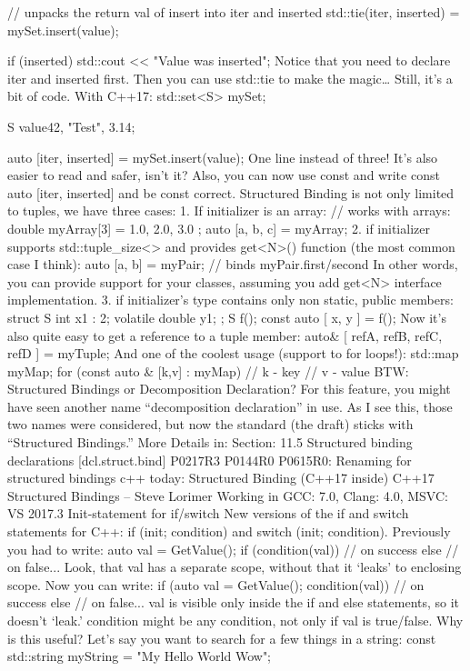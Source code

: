 // unpacks the return val of insert into iter and inserted
std::tie(iter, inserted) = mySet.insert(value);

if (inserted)
    std::cout << "Value was inserted\n";
Notice that you need to declare iter and inserted first. Then you can use std::tie to make the magic… Still, it’s a bit of code.
With C++17:
std::set<S> mySet;

S value{42, "Test", 3.14};

auto [iter, inserted] = mySet.insert(value);
One line instead of three! It’s also easier to read and safer, isn’t it?
Also, you can now use const and write const auto [iter, inserted] and be const correct.
Structured Binding is not only limited to tuples, we have three cases:
1. If initializer is an array:
// works with arrays:
double myArray[3] = { 1.0, 2.0, 3.0 };  
auto [a, b, c] = myArray;
2. if initializer supports std::tuple_size<> and provides get<N>() function (the most common case I think):
auto [a, b] = myPair; // binds myPair.first/second
In other words, you can provide support for your classes, assuming you add get<N> interface implementation.
3. if initializer’s type contains only non static, public members:
struct S { int x1 : 2; volatile double y1; };
S f();
const auto [ x, y ] = f();
Now it’s also quite easy to get a reference to a tuple member:
auto& [ refA, refB, refC, refD ] = myTuple;
And one of the coolest usage (support to for loops!):
std::map myMap;    
for (const auto & [k,v] : myMap) 
{  
    // k - key
    // v - value
} 
BTW: Structured Bindings or Decomposition Declaration?
For this feature, you might have seen another name “decomposition declaration” in use. As I see this, those two names were considered, but now the standard (the draft) sticks with “Structured Bindings.” 
More Details in:
Section: 11.5 Structured binding declarations [dcl.struct.bind]
P0217R3
P0144R0
P0615R0: Renaming for structured bindings
c++ today: Structured Binding (C++17 inside)
C++17 Structured Bindings – Steve Lorimer
Working in GCC: 7.0, Clang: 4.0, MSVC: VS 2017.3
Init-statement for if/switch
New versions of the if and switch statements for C++: 
if (init; condition) and switch (init; condition). 
Previously you had to write:
{   
    auto val = GetValue();   
    if (condition(val))    
        // on success  
    else   
        // on false... 
}
Look, that val has a separate scope, without that it ‘leaks’ to enclosing scope.
Now you can write:
if (auto val = GetValue(); condition(val))    
    // on success  
else   
    // on false... 
val is visible only inside the if and else statements, so it doesn’t ‘leak.’ 
condition might be any condition, not only if val is true/false.
Why is this useful?
Let’s say you want to search for a few things in a string:
const std::string myString = "My Hello World Wow";

